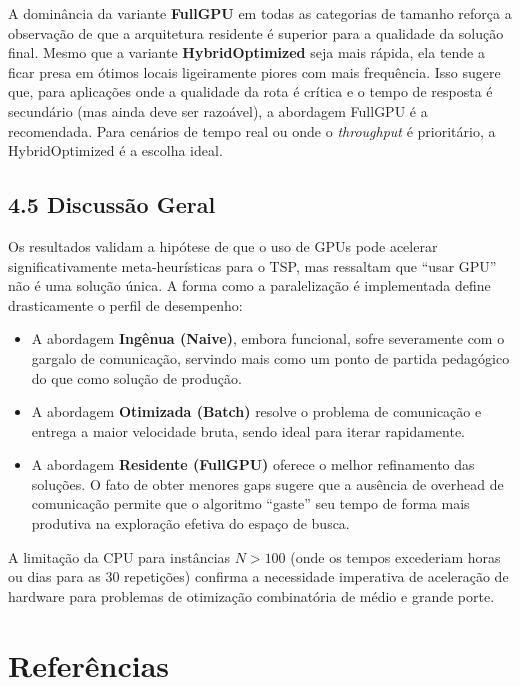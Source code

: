 A dominância da variante \textbf{FullGPU} em todas as categorias de
tamanho reforça a observação de que a arquitetura residente é superior
para a qualidade da solução final. Mesmo que a variante
\textbf{HybridOptimized} seja mais rápida, ela tende a ficar presa em
ótimos locais ligeiramente piores com mais frequência. Isso sugere que,
para aplicações onde a qualidade da rota é crítica e o tempo de resposta
é secundário (mas ainda deve ser razoável), a abordagem FullGPU é a
recomendada. Para cenários de tempo real ou onde o \emph{throughput} é
prioritário, a HybridOptimized é a escolha ideal.

\subsection{4.5 Discussão Geral}\label{sec-45-discussao-geral}

Os resultados validam a hipótese de que o uso de GPUs pode acelerar
significativamente meta-heurísticas para o TSP, mas ressaltam que ``usar
GPU'' não é uma solução única. A forma como a paralelização é
implementada define drasticamente o perfil de desempenho:

\begin{itemize}
\tightlist
\item
  A abordagem \textbf{Ingênua (Naive)}, embora funcional, sofre
  severamente com o gargalo de comunicação, servindo mais como um ponto
  de partida pedagógico do que como solução de produção.
\item
  A abordagem \textbf{Otimizada (Batch)} resolve o problema de
  comunicação e entrega a maior velocidade bruta, sendo ideal para
  iterar rapidamente.
\item
  A abordagem \textbf{Residente (FullGPU)} oferece o melhor refinamento
  das soluções. O fato de obter menores gaps sugere que a ausência de
  overhead de comunicação permite que o algoritmo ``gaste'' seu tempo de
  forma mais produtiva na exploração efetiva do espaço de busca.
\end{itemize}

A limitação da CPU para instâncias \(N > 100\) (onde os tempos
excederiam horas ou dias para as 30 repetições) confirma a necessidade
imperativa de aceleração de hardware para problemas de otimização
combinatória de médio e grande porte.

\section*{Referências}\label{bibliography}

